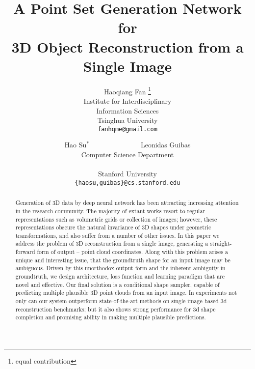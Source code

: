 \documentclass[10pt,twocolumn,letterpaper]{article}
\begin{document}
\title{A Point Set Generation Network for \\ 3D Object Reconstruction from a Single Image}

\author{Haoqiang Fan \thanks{equal contribution} \\
Institute for Interdisciplinary\\ Information Sciences\\
Tsinghua University\\
{\tt\small fanhqme@gmail.com}
\and
Hao Su${}^*$~~~~~~~~~~~~~~~Leonidas Guibas\\
Computer Science Department\\
\\
Stanford University\\
{\tt\small \{haosu,guibas\}@cs.stanford.edu}
}

\maketitle

\begin{abstract}
  Generation of 3D data by deep neural network has been attracting increasing attention in the research community. The majority of extant works resort to regular representations such as volumetric grids or collection of images; however, these representations obscure the natural invariance of 3D shapes under geometric transformations, and also suffer from a number of other issues.
In this paper we address the problem of 3D reconstruction from a single image, generating a straight-forward form of output -- point cloud coordinates. Along with this problem arises a unique and interesting issue, that the groundtruth shape for an input image may be ambiguous. Driven by this unorthodox output form and the inherent ambiguity in groundtruth, we design architecture, loss function and learning paradigm that are novel and effective. Our final solution is a conditional shape sampler, capable of predicting multiple plausible 3D point clouds from an input image.
In experiments not only can our system outperform state-of-the-art methods on single image based 3d reconstruction benchmarks; but it also shows strong performance for 3d shape completion and promising ability in making multiple plausible predictions.
\end{abstract}
\end{document}
